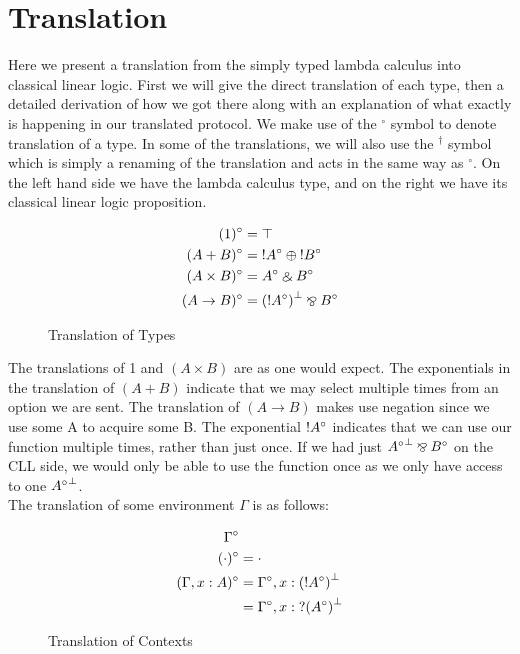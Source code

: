 \chapter{Translation}
\label{chap: translation}

Here we present a translation from the simply typed lambda calculus into classical linear logic. First 
we will give the direct translation of each type, then a detailed derivation of how we got there along 
with an explanation of what exactly is happening in our translated protocol. We 
make use of the $^{\circ}$ symbol to denote translation of a type. In some of the translations, we will 
also use the $^\dagger$ symbol which is simply a renaming of the translation and acts in the same way as 
$^\circ$. On the left hand side we have the lambda calculus type, and on the right we have its classical 
linear logic proposition. 
\begin{figure}[h]
  \begin{align*}
      (1)^\circ &= \top\\
      (A + B)^\circ &= \ofc A^\circ \oplus \ofc B^\circ \\
      (A \times B)^\circ &= A^\circ \with B^\circ \\
      (A \rightarrow B)^\circ &= \negg{(\ofc A^\circ)} \parr B^\circ
  \end{align*} 
  \caption{Translation of Types}
  \label{fig: tt}
\end{figure}

\noindent
The translations of 1 and $(A \times B)$ are as one would expect. The exponentials in the translation 
of $(A + B)$ indicate that we may select multiple times from an option we are sent. The translation 
of $(A \rightarrow B)$ makes use negation since we use some A to acquire some B. The exponential $\textrm{!} A^\circ$ 
indicates that we can use our function multiple times, rather than just once. If we had just 
$\negg{A^\circ} \parr B^\circ$ on the CLL side, we would only be able to use the function once as we 
only have access to one $\negg{A^\circ}$. \\

\noindent
The translation of some environment $\Gamma$ is as follows: 
\begin{figure}[h]
  \begin{align*}
    \Gamma^\circ & \\
    (\cdot)^\circ &= \cdot \\
    (\Gamma, x:A)^\circ &= \Gamma^\circ, x: \negg{(\ofc A^\circ)} \\
    &= \Gamma^\circ, x: \whynot \negg{(A^\circ)}
  \end{align*}
  \caption{Translation of Contexts}
  \label{fig: tc} 
\end{figure}

